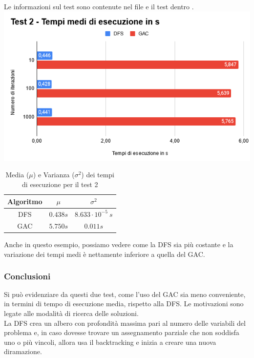 \documentclass[12pt, letterpaper]{article}
\begin{document}
\noindent Le informazioni sul test sono contenute nel file  e il test dentro
. \\

\includegraphics[scale=0.8]{test-2-performance.png}


\begin{table}[h!]
      \centering
      \begin{tabular}{| c | c | c |}
            \hline
            Algoritmo & $\mu$    & $\sigma^2$                \\
            \hline
            DFS       & $0.438s$ & $8.633 \cdot 10^{-5} \ s$ \\
            GAC       & $5.750s$ & $0.011s$                  \\
            \hline
      \end{tabular}
      \caption{Media ($\mu$) e Varianza ($\sigma^2$) dei tempi di esecuzione per il test 2}
\end{table}

\noindent Anche in questo esempio, possiamo vedere come la DFS sia più costante e la variazione dei tempi
medi è nettamente inferiore a quella del GAC.

\subsubsection{Conclusioni}

\noindent Si può evidenziare da questi due test, come l'uso del GAC sia meno conveniente, in termini
di tempo di esecuzione media, rispetto alla DFS. Le motivazioni sono legate alle modalità di ricerca delle soluzioni. \\

\noindent La DFS crea un albero con profondità massima pari al numero delle variabili del problema e, in
caso dovesse trovare un assegnamento parziale che non soddisfa uno o più vincoli, allora usa il
backtracking e inizia a creare una nuova diramazione. \\
\end{document}
